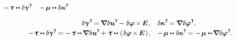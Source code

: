 ${- \hspace{.2ex} \forcestresstensor \dotdotp \variation{\distortiontensor}^{\T}}$
~${- \hspace{.2ex} \couplestresstensor \dotdotp \variation{\wrynesstensor}^{\T}}$

\nopagebreak\begin{equation*}
\begin{array}{rl}
\variation{\distortiontensor}^{\T} \hspace{-0.32ex}
= \hspace{-0.16ex} \boldnabla \variation{\fieldofdisplacements}^{\hspace{-0.05ex}\T} \hspace{-0.3ex}
- \hspace{.1ex} \variation{\fieldofrotations} \hspace{-0.2ex} \times \hspace{-0.2ex} \UnitDyad \hspace{.1ex}
, &
\variation{\wrynesstensor}^{\T} \hspace{-0.32ex} = \hspace{-0.16ex} \boldnabla \variation{\fieldofrotations}^{\T} \hspace{-0.25ex} ,
\\[.25em]
%
- \hspace{.2ex} \forcestresstensor \dotdotp \variation{\distortiontensor}^{\T} \hspace{-0.32ex}
= - \hspace{.2ex} \forcestresstensor \dotdotp \hspace{-0.16ex} \boldnabla \variation{\fieldofdisplacements}^{\hspace{-0.05ex}\T} \hspace{-0.3ex}
+ \forcestresstensor \dotdotp \hspace{-0.32ex} \left( \hspace{.12ex} \variation{\fieldofrotations} \hspace{-0.2ex} \times \hspace{-0.2ex} \UnitDyad \hspace{.12ex} \right) \hspace{-0.25ex}
, &
- \hspace{.2ex} \couplestresstensor \dotdotp \variation{\wrynesstensor}^{\T} \hspace{-0.32ex}
= - \hspace{.2ex} \couplestresstensor \dotdotp \hspace{-0.16ex} \boldnabla \variation{\fieldofrotations}^{\T} \hspace{-0.25ex} .
\end{array}
\end{equation*}

